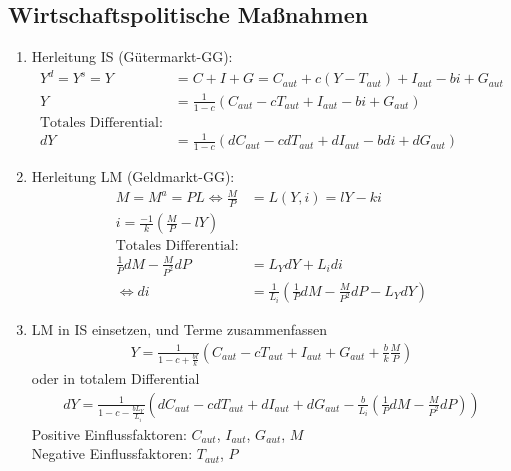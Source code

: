 \documentclass{scrartcl}
\begin{document}
\subsection{Wirtschaftspolitische Ma{\ss}nahmen}
\begin{enumerate}
\item Herleitung IS (G\"{u}termarkt-GG):
\begin{align*}
  Y^d=Y^s=Y &= C+I+G = C_{aut} + c(Y-T_{aut}) + I_{aut}-bi + G_{aut}\\
  Y &= \frac{1}{1-c}(C_{aut} - cT_{aut} + I_{aut}-bi + G_{aut})\\
  \text{Totales Differential:}\\
  dY &= \frac{1}{1-c}(dC_{aut}-c dT_{aut} + dI_{aut} - b di + dG_{aut})
\end{align*}

\item Herleitung LM (Geldmarkt-GG):
\begin{align*}
  M = M^a = P L \Leftrightarrow \frac{M}{P} &= L(Y,i) = lY-ki\\
  i =\frac{-1}{k}\left(\frac{M}{P}-lY\right)\\
  \text{Totales Differential:}\\
  \frac{1}{P}dM - \frac{M}{P^2}dP &= L_Y dY + L_i di\\
  \Leftrightarrow di &= \frac{1}{L_i} \left(\frac{1}{P}dM-\frac{M}{P^2}dP-L_Y dY\right)
\end{align*}
\item LM in IS einsetzen, und Terme zusammenfassen
\begin{align*}
  Y = \frac{1}{1-c +\frac{b l}{k}} \left(C_{aut} - c T_{aut} + I_{aut} +G_{aut} + \frac{b}{k} \frac{M}{P}\right)
\end{align*}
oder in totalem Differential
\begin{align*}
  dY = \frac{1}{1-c -\frac{b L_Y}{L_i}} \left(dC_{aut} - c dT_{aut} + dI_{aut} +dG_{aut} - \frac{b}{L_i} \left(\frac{1}{P}dM-\frac{M}{P^2}dP\right)\right)
\end{align*}
Positive Einflussfaktoren: $C_{aut}$, $I_{aut}$, $G_{aut}$, $M$\\
Negative Einflussfaktoren: $T_{aut}$, $P$


\end{enumerate}
\end{document}

